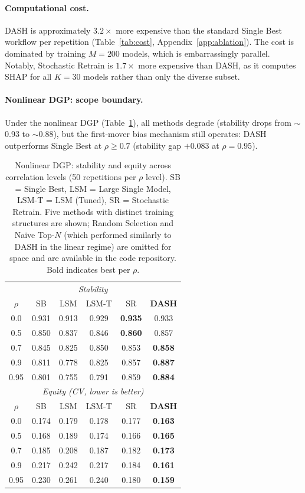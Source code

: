 \documentclass[10pt]{article}
\newcommand{\dash}{\textsc{DASH}}
\newcommand{\rhovar}{\rho}
\begin{document}
\paragraph{Computational cost.}
\dash{} is approximately $3.2\times$ more expensive than the standard
Single Best workflow per repetition (Table~\ref{tab:cost},
Appendix~\ref{app:ablation}). The cost is dominated by training
$M = 200$ models, which is embarrassingly parallel. Notably, Stochastic
Retrain is $1.7\times$ more expensive than \dash{}, as it computes SHAP
for all $K = 30$ models rather than only the diverse subset.

\paragraph{Nonlinear DGP: scope boundary.}
\label{sec:nonlinear}
Under the nonlinear DGP (Table~\ref{tab:nonlinear}), all methods
degrade (stability drops from $\sim$0.93 to $\sim$0.88), but the
first-mover bias mechanism still operates: \dash{} outperforms Single
Best at $\rhovar \geq 0.7$ (stability gap $+0.083$ at $\rhovar = 0.95$).

\begin{table}[htbp]
\centering
\caption{Nonlinear DGP: stability and equity across correlation levels
(50 repetitions per $\rhovar$ level).
SB = Single Best, LSM = Large Single Model, LSM-T = LSM (Tuned),
SR = Stochastic Retrain.
Five methods with distinct training structures are shown; Random Selection
and Naive Top-$N$ (which performed similarly to \dash{} in the linear regime)
are omitted for space and are available in the code repository.
Bold indicates best per $\rhovar$.}
\label{tab:nonlinear}
\begin{tabular}{cccccc}
\toprule
\multicolumn{6}{c}{\textit{Stability}} \\
$\rhovar$ & SB & LSM & LSM-T & SR & \textbf{DASH} \\
\midrule
0.0  & 0.931 & 0.913 & 0.929 & \textbf{0.935} & 0.933 \\
0.5  & 0.850 & 0.837 & 0.846 & \textbf{0.860} & 0.857 \\
0.7  & 0.845 & 0.825 & 0.850 & 0.853 & \textbf{0.858} \\
0.9  & 0.811 & 0.778 & 0.825 & 0.857 & \textbf{0.887} \\
0.95 & 0.801 & 0.755 & 0.791 & 0.859 & \textbf{0.884} \\
\midrule
\multicolumn{6}{c}{\textit{Equity (CV, lower is better)}} \\
$\rhovar$ & SB & LSM & LSM-T & SR & \textbf{DASH} \\
\midrule
0.0  & 0.174 & 0.179 & 0.178 & 0.177 & \textbf{0.163} \\
0.5  & 0.168 & 0.189 & 0.174 & 0.166 & \textbf{0.165} \\
0.7  & 0.185 & 0.208 & 0.187 & 0.182 & \textbf{0.173} \\
0.9  & 0.217 & 0.242 & 0.217 & 0.184 & \textbf{0.161} \\
0.95 & 0.230 & 0.261 & 0.240 & 0.180 & \textbf{0.159} \\
\bottomrule
\end{tabular}
\end{table}
\end{document}
